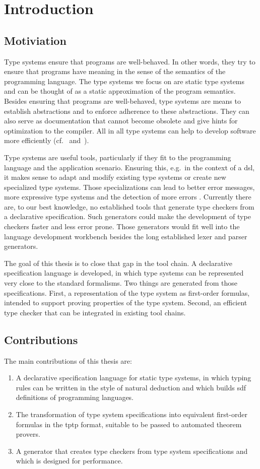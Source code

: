 \chapter{Introduction}
\section{Motiviation}
Type systems ensure that programs are well-behaved. In other words,
they try to ensure that programs have meaning in the sense of the
semantics of the programming language. The type systems we focus on
are static type systems and can be thought of as a static
approximation of the program semantics. Besides ensuring that programs
are well-behaved, type systems are means to establish abstractions and
to enforce adherence to these abstractions. They can also serve as
documentation that cannot become obsolete and give hints for
optimization to the compiler. All in all type systems can help to
develop software more efficiently
(cf.~\cite{Petersen:2014:ECS:2597008.2597152}
and~\cite{Mayer:2012:ESI:2384616.2384666}).

Type systems are useful tools, particularly if they fit to the
programming language and the application scenario. Ensuring this,
e.g.\ in the context of a \gls{dsl}, it makes sense to adapt and
modify existing type systems or create new specialized type
systems. Those specializations can lead to better error messages, more
expressive type systems and the detection of more errors
\cite{Thiemann02programmabletype}. Currently there are, to our best
knowledge, no established tools that generate type checkers from a
declarative specification. Such generators could make the development
of type checkers faster and less error prone. Those generators would
fit well into the language development workbench besides the long
established lexer and parser generators.

The goal of this thesis is to close that gap in the tool chain. A
declarative specification language is developed, in which type systems
can be represented very close to the standard formalisms. Two things
are generated from those specifications. First, a representation of
the type system as first-order formulas, intended to support proving
properties of the type system. Second, an efficient type checker that
can be integrated in existing tool chains.
\section{Contributions}
The main contributions of this thesis are:
\begin{enumerate}
\item A declarative specification language for static type systems, in
  which typing rules can be written in the style of natural deduction
  and which builds \gls{sdf} definitions of programming languages.
\item The transformation of type system specifications into equivalent
  first-order formulas in the \gls{tptp} format, suitable to be passed to
  automated theorem provers.
\item A generator that creates type checkers from type system
  specifications and which is designed for performance.
\end{enumerate}

